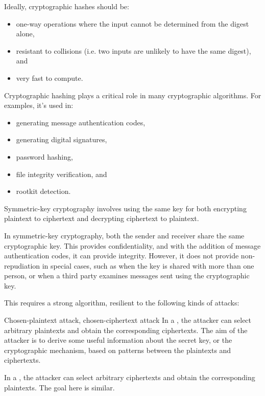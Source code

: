 Ideally, cryptographic hashes should be:

\begin{itemize}
    \item one-way operations where the input cannot be determined from the digest alone,
    \item resistant to collisions (i.e. two inputs are unlikely to have the same digest), and
    \item very fast to compute.
\end{itemize}

Cryptographic hashing plays a critical role in many cryptographic algorithms. For examples, it's used in:

\begin{itemize}
    \item generating message authentication codes,
    \item generating digital signatures,
    \item password hashing,
    \item file integrity verification, and
    \item rootkit detection.
\end{itemize}
 
\begin{dfnbox}{Symmetric-key cryptography}{}
     involves using the same key for both encrypting plaintext to ciphertext and decrypting ciphertext to plaintext.
\end{dfnbox}

In symmetric-key cryptography, both the sender and receiver share the same cryptographic key. This provides confidentiality, and with the addition of message authentication codes, it can provide integrity. However, it does not provide non-repudiation in special cases, such as when the key is shared with more than one person, or when a third party examines messages sent using the cryptographic key.

This requires a strong algorithm, resilient to the following kinds of attacks:

\begin{dfnbox}{Chosen-plaintext attack, chosen-ciphertext attack}{}
    In a , the attacker can select arbitrary plaintexts and obtain the corresponding ciphertexts. The aim of the attacker is to derive some useful information about the secret key, or the cryptographic mechanism, based on patterns between the plaintexts and ciphertexts.

    In a , the attacker can select arbitrary ciphertexts and obtain the corresponding plaintexts. The goal here is similar.
\end{dfnbox}

